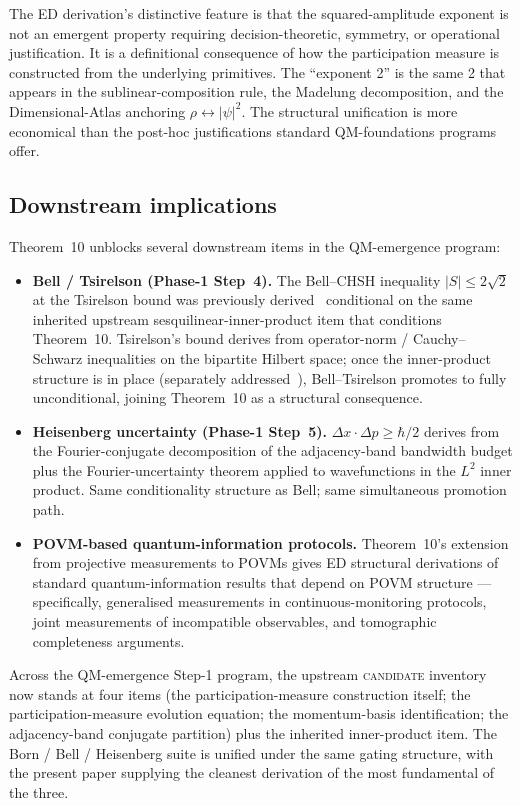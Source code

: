 \documentclass[11pt,a4paper]{article}
\begin{document}
The ED derivation's distinctive feature is that the squared-amplitude exponent is not an emergent property requiring decision-theoretic, symmetry, or operational justification. It is a definitional consequence of how the participation measure is constructed from the underlying primitives. The ``exponent 2'' is the same 2 that appears in the sublinear-composition rule, the Madelung decomposition, and the Dimensional-Atlas anchoring $\rho \leftrightarrow |\psi|^2$. The structural unification is more economical than the post-hoc justifications standard QM-foundations programs offer.

\subsection{Downstream implications}

Theorem~10 unblocks several downstream items in the QM-emergence program:

\begin{itemize}
  \item \textbf{Bell / Tsirelson (Phase-1 Step~4).} The Bell--CHSH inequality $|S| \leq 2\sqrt{2}$ at the Tsirelson bound was previously derived~\cite[\S 3.4]{phase1} conditional on the same inherited upstream sesquilinear-inner-product item that conditions Theorem~10. Tsirelson's bound derives from operator-norm / Cauchy--Schwarz inequalities on the bipartite Hilbert space; once the inner-product structure is in place (separately addressed~\cite{u2discrete,u2continuum}), Bell--Tsirelson promotes to fully unconditional, joining Theorem~10 as a structural consequence.
  \item \textbf{Heisenberg uncertainty (Phase-1 Step~5).} $\Delta x \cdot \Delta p \geq \hbar/2$ derives from the Fourier-conjugate decomposition of the adjacency-band bandwidth budget plus the Fourier-uncertainty theorem applied to wavefunctions in the $L^2$ inner product. Same conditionality structure as Bell; same simultaneous promotion path.
  \item \textbf{POVM-based quantum-information protocols.} Theorem~10's extension from projective measurements to POVMs gives ED structural derivations of standard quantum-information results that depend on POVM structure --- specifically, generalised measurements in continuous-monitoring protocols, joint measurements of incompatible observables, and tomographic completeness arguments.
\end{itemize}

Across the QM-emergence Step-1 program, the upstream \textsc{candidate} inventory now stands at four items (the participation-measure construction itself; the participation-measure evolution equation; the momentum-basis identification; the adjacency-band conjugate partition) plus the inherited inner-product item. The Born / Bell / Heisenberg suite is unified under the same gating structure, with the present paper supplying the cleanest derivation of the most fundamental of the three.
\end{document}
